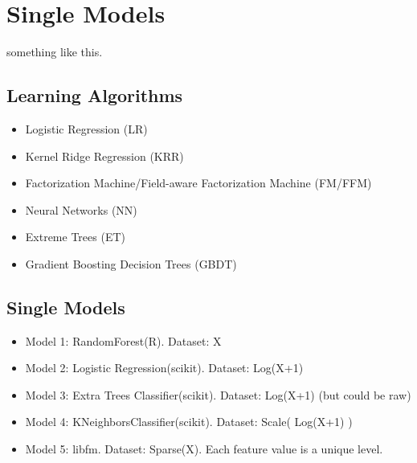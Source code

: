 \section{Single Models}
something like this.

\subsection{Learning Algorithms}
\begin{itemize}
\setlength\itemsep{0em}
\item Logistic Regression (LR)
\item Kernel Ridge Regression (KRR)
\item Factorization Machine/Field-aware Factorization Machine (FM/FFM)
\item Neural Networks (NN)
\item Extreme Trees (ET)
\item Gradient Boosting Decision Trees (GBDT)
\end{itemize}

\subsection{Single Models}
\begin{itemize}
  \setlength\itemsep{0em}
  \item Model 1: RandomForest(R). Dataset: X
  \item Model 2: Logistic Regression(scikit). Dataset: Log(X+1)
  \item Model 3: Extra Trees Classifier(scikit). Dataset: Log(X+1) (but could be raw)
  \item Model 4: KNeighborsClassifier(scikit). Dataset: Scale( Log(X+1) )
  \item Model 5: libfm. Dataset: Sparse(X). Each feature value is a unique level.
\end{itemize}

